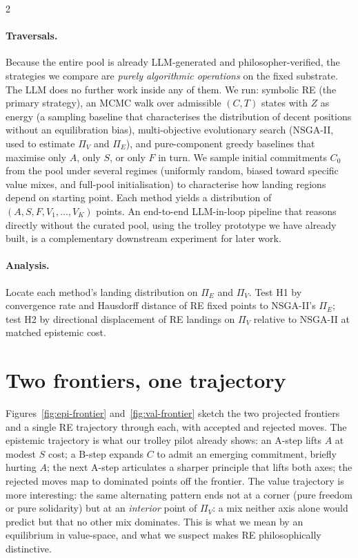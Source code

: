 \documentclass[10pt]{article}
\begin{document}
\begin{multicols}{2}
\paragraph{Traversals.} Because the entire pool is already LLM-generated and
philosopher-verified, the strategies we compare are \emph{purely algorithmic
operations} on the fixed substrate. The LLM does no further work inside any
of them. We run: symbolic RE (the primary strategy), an MCMC walk over
admissible $(C, T)$ states with $Z$ as energy (a sampling baseline that
characterises the distribution of decent positions without an equilibration
bias), multi-objective evolutionary search (NSGA-II, used to estimate
$\Pi_V$ and $\Pi_E$), and pure-component greedy baselines that maximise only
$A$, only $S$, or only $F$ in turn. We sample initial commitments $C_0$ from
the pool under several regimes (uniformly random, biased toward specific
value mixes, and full-pool initialisation) to characterise how landing
regions depend on starting point. Each method yields a distribution of
$(A, S, F, V_1, \dots, V_K)$ points. An end-to-end LLM-in-loop pipeline
that reasons directly without the curated pool, using the trolley prototype
we have already built, is a complementary downstream experiment for later
work.

\paragraph{Analysis.} Locate each method's landing distribution on $\Pi_E$
and $\Pi_V$. Test H1 by convergence rate and Hausdorff distance of RE fixed
points to NSGA-II's $\Pi_E$; test H2 by directional displacement of RE
landings on $\Pi_V$ relative to NSGA-II at matched epistemic cost.

\section{Two frontiers, one trajectory}

Figures~\ref{fig:epi-frontier} and~\ref{fig:val-frontier} sketch the two
projected frontiers and a single RE trajectory through each, with accepted and
rejected moves. The epistemic trajectory is what our trolley pilot already
shows: an A-step lifts $A$ at modest $S$ cost; a B-step expands $C$ to admit
an emerging commitment, briefly hurting $A$; the next A-step articulates a
sharper principle that lifts both axes; the rejected moves map to dominated
points off the frontier. The value trajectory is more interesting: the same
alternating pattern ends not at a corner (pure freedom or pure solidarity) but
at an \emph{interior} point of $\Pi_V$: a mix neither axis alone would
predict but that no other mix dominates. This is what we mean by an
equilibrium in value-space, and what we suspect makes RE philosophically
distinctive.


\end{multicols}
\end{document}
